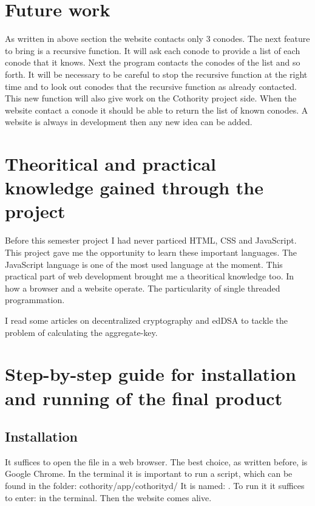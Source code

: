 \documentclass[11pt, a4paper, twoside, openright, openany]{article} %
\begin{document}
\section{Future work}
As written in above section the website contacts only 3 conodes. The next feature
to bring is a recursive function. It will ask each conode to provide a list of each conode
that it knows. Next the program contacts the conodes of the list and so forth.
\newline
It will be necessary to be careful to stop the recursive function at the right time and
to look out conodes that the recursive function as already contacted.
\newline
This new function will also give work on the Cothority project side. When the website
contact a conode it should be able to return the list of known conodes.
\newline \newline
A website is always in development then any new idea can be added.
\bigbreak

\section{Theoritical and practical knowledge gained through the project}
Before this semester project I had never particed HTML, CSS and JavaScript. This
project gave me the opportunity to learn these important languages. The JavaScript language is
one of the most used language at the moment.
\newline
This practical part of web development brought me a theoritical knowledge too.
In how a browser and a website operate. The particularity of single threaded programmation.
\newline \newline

I read some articles on decentralized cryptography and edDSA to tackle the problem
of calculating the aggregate-key.
\bigbreak

\section{Step-by-step guide for installation and running of the final product}
\subsection{Installation}
It suffices to open the file  in a web browser. The best choice, as
written before, is Google Chrome.
\newline
In the terminal it is important to run a script, which can be found in the folder: cothority/app/cothorityd/
\newline
It is named: . To run it it suffices to enter:  in the terminal.
\newline \newline
Then the website comes alive.
\bigbreak
\end{document}
